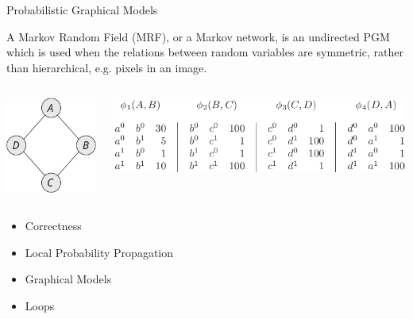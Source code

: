 \documentclass{beamer}
\begin{document}
\begin{frame}{Probabilistic Graphical Models}
    \pause
    \begin{definition}
        A Markov Random Field (MRF), or a Markov network, is an undirected PGM which is used when the relations between
        random variables are symmetric, rather than hierarchical, e.g. pixels in an image.
    \end{definition}
    \pause
    \begin{columns}
        \begin{column}[t]{0.2 \textwidth}
            \includegraphics[scale=0.4]{mrf1}
        \end{column}
        \begin{column}[t]{0.8 \textwidth}
            \includegraphics[scale=0.4]{mrf2}
        \end{column}
    \end{columns}
\end{frame}
\begin{frame}
    \begin{itemize}
        \item Correctness
        \item \alert<2>{Local Probability Propagation}
        \item \alert<1>{Graphical Models}
        \item Loops
    \end{itemize}
\end{frame}
\end{document}
